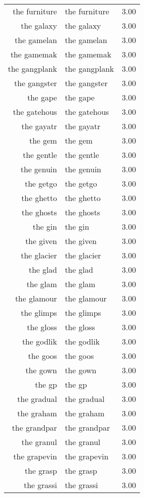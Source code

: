 \begin{table}[ht]
\begin{tabular}{rlr}
  the furniture & the furniture & 3.00 \\ 
  the galaxy & the galaxy & 3.00 \\ 
  the gamelan & the gamelan & 3.00 \\ 
  the gamemak & the gamemak & 3.00 \\ 
  the gangplank & the gangplank & 3.00 \\ 
  the gangster & the gangster & 3.00 \\ 
  the gape & the gape & 3.00 \\ 
  the gatehous & the gatehous & 3.00 \\ 
  the gayatr & the gayatr & 3.00 \\ 
  the gem & the gem & 3.00 \\ 
  the gentle & the gentle & 3.00 \\ 
  the genuin & the genuin & 3.00 \\ 
  the getgo & the getgo & 3.00 \\ 
  the ghetto & the ghetto & 3.00 \\ 
  the ghosts & the ghosts & 3.00 \\ 
  the gin & the gin & 3.00 \\ 
  the given & the given & 3.00 \\ 
  the glacier & the glacier & 3.00 \\ 
  the glad & the glad & 3.00 \\ 
  the glam & the glam & 3.00 \\ 
  the glamour & the glamour & 3.00 \\ 
  the glimps & the glimps & 3.00 \\ 
  the gloss & the gloss & 3.00 \\ 
  the godlik & the godlik & 3.00 \\ 
  the goos & the goos & 3.00 \\ 
  the gown & the gown & 3.00 \\ 
  the gp & the gp & 3.00 \\ 
  the gradual & the gradual & 3.00 \\ 
  the graham & the graham & 3.00 \\ 
  the grandpar & the grandpar & 3.00 \\ 
  the granul & the granul & 3.00 \\ 
  the grapevin & the grapevin & 3.00 \\ 
  the grasp & the grasp & 3.00 \\ 
  the grassi & the grassi & 3.00 \\ 

\end{tabular}
\end{table}
